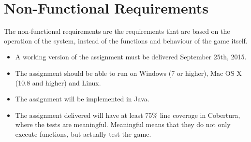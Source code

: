 \chapter{Non-Functional Requirements}

The non-functional requirements are the requirements that are based on the operation of the system, instead of the functions and behaviour of the game itself.

\begin{itemize}
\itemsep0em
	\item A working version of the assignment must be delivered September 25th, 2015.
	\item The assignment should be able to run on Windows (7 or higher), Mac OS X (10.8 and higher) and Linux.
	\item The assignment will be implemented in Java. 
	\item The assignment delivered will have at least 75\% line coverage in Cobertura, where the tests are meaningful. Meaningful means that they do not only execute functions, but actually test the game. 
\end{itemize}